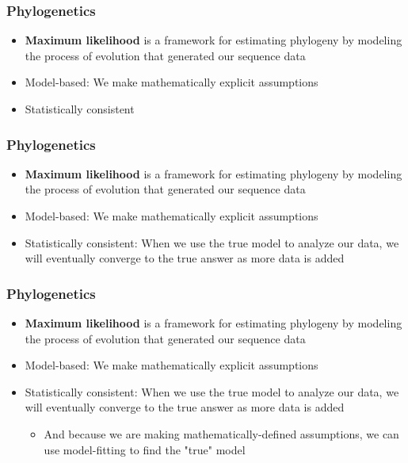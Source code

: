 \documentclass{beamer}
\begin{document}
\begin{frame}
\frametitle{Phylogenetics}
\begin{itemize}
\item \textbf{Maximum likelihood} is a framework for estimating phylogeny by modeling the process of evolution that generated our sequence data
\item Model-based: We make mathematically explicit assumptions 
\item Statistically consistent
\end{itemize}
\end{frame}

\begin{frame}
\frametitle{Phylogenetics}
\begin{itemize}
\item \textbf{Maximum likelihood} is a framework for estimating phylogeny by modeling the process of evolution that generated our sequence data
\item Model-based: We make mathematically explicit assumptions 
\item Statistically consistent: When we use the true model to analyze our data, we will eventually converge to the true answer as more data is added
\end{itemize}
\end{frame}
\begin{frame}
\frametitle{Phylogenetics}
\begin{itemize}
\item \textbf{Maximum likelihood} is a framework for estimating phylogeny by modeling the process of evolution that generated our sequence data
\item Model-based: We make mathematically explicit assumptions 
\item Statistically consistent: When we use the true model to analyze our data, we will eventually converge to the true answer as more data is added
\begin{itemize}
\item And because we are making mathematically-defined assumptions, we can use model-fitting to find the "true" model
\end{itemize}
\end{itemize}
\end{frame}
\end{document}
